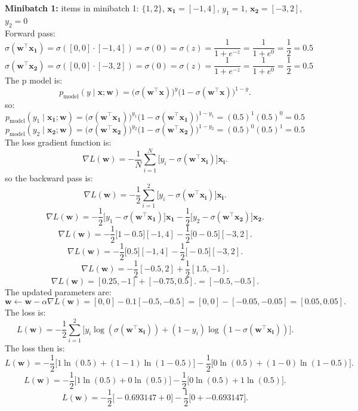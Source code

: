 \documentclass[a3paper,12pt]{article} %
\begin{document}
\textbf{Minibatch 1:}
items in minibatch 1: \(\{1, 2\}\), \(\mathbf{x_1} = [-1, 4]\), \(y_1 = 1\), \(\mathbf{x_2} = [-3, 2]\), \(y_2 = 0\)
\\ Forward pass:
\[
\sigma(\mathbf{w}^\top \mathbf{x_1}) = \sigma([0, 0] \cdot [-1, 4]) = \sigma(0) = \sigma(z) = \frac{1}{1 + e^{-z}} = \frac{1}{1 + e^{0}} = \frac{1}{2} = 0.5
\]
\[
\sigma(\mathbf{w}^\top \mathbf{x_2}) = \sigma([0, 0] \cdot [-3, 2]) = \sigma(0) = \sigma(z) = \frac{1}{1 + e^{-z}} = \frac{1}{1 + e^{0}} = \frac{1}{2} = 0.5
\]
The p model is:
\[
p_{\text{model}}(y \mid \mathbf{x}; \mathbf{w}) = \big(\sigma(\mathbf{w}^\top \mathbf{x})\big)^y \big(1 - \sigma(\mathbf{w}^\top \mathbf{x})\big)^{1-y}.
\]
so:
\[
p_{\text{model}}(y_1 \mid \mathbf{x_1}; \mathbf{w}) = \big(\sigma(\mathbf{w}^\top \mathbf{x_1})\big)^{y_1} \big(1 - \sigma(\mathbf{w}^\top \mathbf{x_1})\big)^{1-y_1} = (0.5)^1 (0.5)^0 = 0.5
\]
\[
p_{\text{model}}(y_2 \mid \mathbf{x_2}; \mathbf{w}) = \big(\sigma(\mathbf{w}^\top \mathbf{x_2})\big)^{y_2} \big(1 - \sigma(\mathbf{w}^\top \mathbf{x_2})\big)^{1-y_2} = (0.5)^0 (0.5)^1 = 0.5
\]
The loss gradient function is:
\[
\nabla L(\mathbf{w}) = -\frac{1}{N} \sum^N_{i=1} \big[y_i - \sigma(\mathbf{w}^\top \mathbf{x_i})\big] \mathbf{x_i}.
\]
so the backward pass is:
\[
\nabla L(\mathbf{w}) = -\frac{1}{2} \sum^2_{i=1} \big[y_i - \sigma(\mathbf{w}^\top \mathbf{x_i})\big] \mathbf{x_i}.
\]
\[
\nabla L(\mathbf{w}) = -\frac{1}{2} \big[y_1 - \sigma(\mathbf{w}^\top \mathbf{x_1})\big] \mathbf{x_1} - \frac{1}{2} \big[y_2 - \sigma(\mathbf{w}^\top \mathbf{x_2})\big] \mathbf{x_2}.
\]
\[
\nabla L(\mathbf{w}) = -\frac{1}{2} \big[1 - 0.5\big] [-1, 4] - \frac{1}{2} \big[0 - 0.5\big] [-3, 2].
\]
\[
\nabla L(\mathbf{w}) = -\frac{1}{2} \big[0.5\big] [-1, 4] - \frac{1}{2} \big[-0.5\big] [-3, 2].
\]
\[
\nabla L(\mathbf{w}) = -\frac{1}{2} [-0.5, 2] + \frac{1}{2} [1.5, -1].
\]
\[
\nabla L(\mathbf{w}) = [0.25, -1] + [-0.75, 0.5]. = [-0.5, -0.5].
\]  
The updated parameters are:
\[
\mathbf{w} \gets \mathbf{w} - \alpha \nabla L(\mathbf{w}) = [0, 0] - 0.1 [-0.5, -0.5] = [0, 0] - [-0.05, -0.05] = [0.05, 0.05].
\]
The loss is:
\[
L(\mathbf{w}) = -\frac{1}{2} \sum^2_{i=1} \big[y_i \log(\sigma(\mathbf{w}^\top \mathbf{x_i})) + (1-y_i) \log(1-\sigma(\mathbf{w}^\top \mathbf{x_i}))\big].
\]
The loss then is:
\[
L(\mathbf{w}) = -\frac{1}{2} \big[1 \ln(0.5) + (1-1) \ln(1-0.5)\big] - \frac{1}{2} \big[0 \ln(0.5) + (1-0) \ln(1-0.5)\big].
\]
\[
L(\mathbf{w}) = -\frac{1}{2} \big[1 \ln(0.5) + 0 \ln(0.5)\big] - \frac{1}{2} \big[0 \ln(0.5) + 1 \ln(0.5)\big].
\]
\[
L(\mathbf{w}) = -\frac{1}{2} \big[-0.693147 + 0\big] - \frac{1}{2} \big[0 + -0.693147\big].
\]
\end{document}
